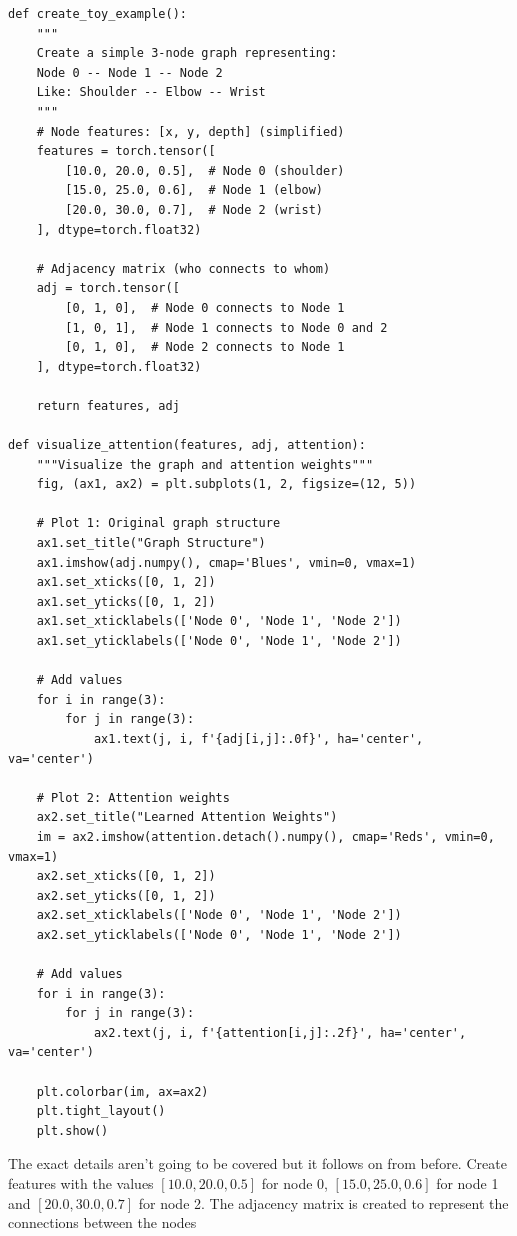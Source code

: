 \begin{lstlisting}[style=pythonstyle,title={Setting up toy problem},label={code:toy_gat_setup}]
def create_toy_example():
    """
    Create a simple 3-node graph representing:
    Node 0 -- Node 1 -- Node 2
    Like: Shoulder -- Elbow -- Wrist
    """
    # Node features: [x, y, depth] (simplified)
    features = torch.tensor([
        [10.0, 20.0, 0.5],  # Node 0 (shoulder)
        [15.0, 25.0, 0.6],  # Node 1 (elbow)
        [20.0, 30.0, 0.7],  # Node 2 (wrist)
    ], dtype=torch.float32)
    
    # Adjacency matrix (who connects to whom)
    adj = torch.tensor([
        [0, 1, 0],  # Node 0 connects to Node 1
        [1, 0, 1],  # Node 1 connects to Node 0 and 2
        [0, 1, 0],  # Node 2 connects to Node 1
    ], dtype=torch.float32)
    
    return features, adj

def visualize_attention(features, adj, attention):
    """Visualize the graph and attention weights"""
    fig, (ax1, ax2) = plt.subplots(1, 2, figsize=(12, 5))
    
    # Plot 1: Original graph structure
    ax1.set_title("Graph Structure")
    ax1.imshow(adj.numpy(), cmap='Blues', vmin=0, vmax=1)
    ax1.set_xticks([0, 1, 2])
    ax1.set_yticks([0, 1, 2])
    ax1.set_xticklabels(['Node 0', 'Node 1', 'Node 2'])
    ax1.set_yticklabels(['Node 0', 'Node 1', 'Node 2'])
    
    # Add values
    for i in range(3):
        for j in range(3):
            ax1.text(j, i, f'{adj[i,j]:.0f}', ha='center', va='center')
    
    # Plot 2: Attention weights
    ax2.set_title("Learned Attention Weights")
    im = ax2.imshow(attention.detach().numpy(), cmap='Reds', vmin=0, vmax=1)
    ax2.set_xticks([0, 1, 2])
    ax2.set_yticks([0, 1, 2])
    ax2.set_xticklabels(['Node 0', 'Node 1', 'Node 2'])
    ax2.set_yticklabels(['Node 0', 'Node 1', 'Node 2'])
    
    # Add values
    for i in range(3):
        for j in range(3):
            ax2.text(j, i, f'{attention[i,j]:.2f}', ha='center', va='center')
    
    plt.colorbar(im, ax=ax2)
    plt.tight_layout()
    plt.show()
\end{lstlisting}

The exact details aren't going to be covered but it follows on from before.
Create features with the values $[10.0, 20.0, 0.5]$ for node 0, $[15.0, 25.0, 0.6]$ for node 1 and $[20.0, 30.0, 0.7]$ for node 2.
The adjacency matrix is created to represent the connections between the nodes

